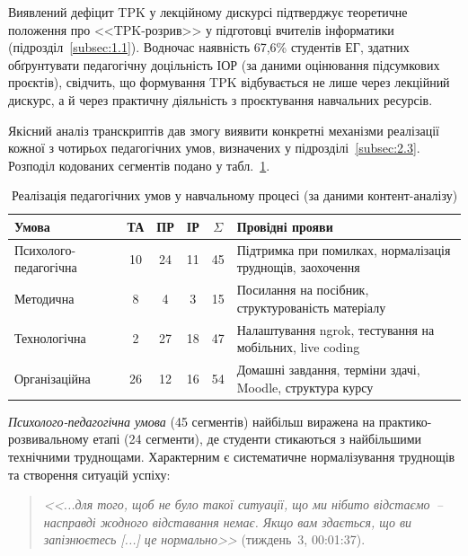 Виявлений дефіцит TPK у лекційному дискурсі підтверджує теоретичне положення про <<TPK-розрив>> у підготовці вчителів інформатики (підрозділ~\ref{subsec:1.1}). Водночас наявність 67,6\% студентів ЕГ, здатних обґрунтувати педагогічну доцільність ІОР (за даними оцінювання підсумкових проєктів), свідчить, що формування TPK відбувається не лише через лекційний дискурс, а й через практичну діяльність з проєктування навчальних ресурсів.


Якісний аналіз транскриптів дав змогу виявити конкретні механізми реалізації кожної з чотирьох педагогічних умов, визначених у підрозділі~\ref{subsec:2.3}. Розподіл кодованих сегментів подано у табл.~\ref{tab:conditions_evidence}.

\begin{table}[!h]
\centering
\caption{Реалізація педагогічних умов у навчальному процесі (за даними контент-аналізу)}
\label{tab:conditions_evidence}
\small
\begin{tabularx}{\linewidth}{|l|c|c|c|c|X|}
\hline
\hfill \textbf{Умова} & \textbf{ТА} & \textbf{ПР} & \textbf{ІР} & \textbf{$\Sigma$} & \hfil \textbf{Провідні прояви} \\
\hline
Психолого-педагогічна & 10 & 24 & 11 & 45 & Підтримка при помилках, нормалізація труднощів, заохочення \\
\hline
Методична & 8 & 4 & 3 & 15 & Посилання на посібник, структурованість матеріалу \\
\hline
Технологічна & 2 & 27 & 18 & 47 & Налаштування ngrok, тестування на мобільних, live coding \\
\hline
Організаційна & 26 & 12 & 16 & 54 & Домашні завдання, терміни здачі, Moodle, структура курсу \\
\hline
\end{tabularx}
\end{table}

\textit{Психолого-педагогічна умова} (45 сегментів) найбільш виражена на практико-розвивальному етапі (24 сегменти), де студенти стикаються з найбільшими технічними труднощами. Характерним є систематичне нормалізування труднощів та створення ситуацій успіху:

\begin{quote}
\textit{<<...для того, щоб не було такої ситуації, що ми нібито відстаємо~-- насправді жодного відставання немає. Якщо вам здається, що ви запізнюєтесь \textnormal{[...]} це нормально>>} (тиждень~3, 00:01:37).
\end{quote}

